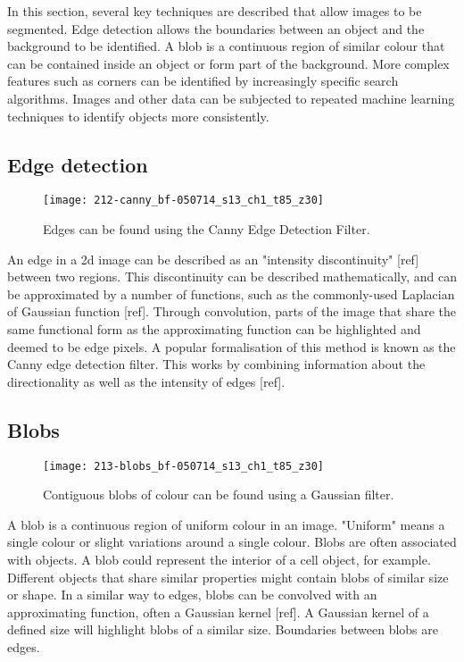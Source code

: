 In this section, several key techniques are described that allow images to be segmented. Edge detection allows the boundaries between an object and the background to be identified. A blob is a continuous region of similar colour that can be contained inside an object or form part of the background. More complex features such as corners can be identified by increasingly specific search algorithms. Images and other data can be subjected to repeated machine learning techniques to identify objects more consistently.

\subsection{Edge detection}

\begin{figure}[htbp!]
\centering
\texttt{[image: 212-canny\_bf-050714\_s13\_ch1\_t85\_z30]}
\caption[The canny filter]{Edges can be found using the Canny Edge Detection Filter.}
\label{fig:canny_filter_bf}
\end{figure}

An edge in a 2d image can be described as an "intensity discontinuity" [ref] between two regions. This discontinuity can be described mathematically, and can be approximated by a number of functions, such as the commonly-used Laplacian of Gaussian function [ref]. Through convolution, parts of the image that share the same functional form as the approximating function can be highlighted and deemed to be edge pixels. A popular formalisation of this method is known as the Canny edge detection filter. This works by combining information about the directionality as well as the intensity of edges [ref].

\subsection{Blobs}

\begin{figure}[htbp!]
\centering
\texttt{[image: 213-blobs\_bf-050714\_s13\_ch1\_t85\_z30]}
\caption[Blob detection]{Contiguous blobs of colour can be found using a Gaussian filter.}
\label{fig:blob_detection_bf}
\end{figure}

A blob is a continuous region of uniform colour in an image. "Uniform" means a single colour or slight variations around a single colour. Blobs are often associated with objects. A blob could represent the interior of a cell object, for example. Different objects that share similar properties might contain blobs of similar size or shape. In a similar way to edges, blobs can be convolved with an approximating function, often a Gaussian kernel [ref]. A Gaussian kernel of a defined size will highlight blobs of a similar size. Boundaries between blobs are edges.


